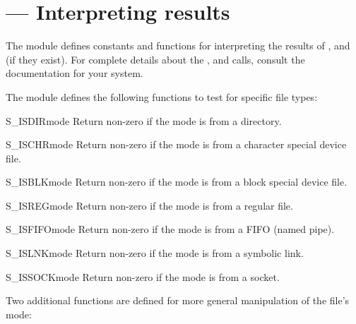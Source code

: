 \section{ ---
         Interpreting  results}



The  module defines constants and functions for
interpreting the results of ,
 and  (if they exist).  For
complete details about the ,  and
 calls, consult the documentation for your system.

The  module defines the following functions to test for
specific file types:


\begin{funcdesc}{S_ISDIR}{mode}
Return non-zero if the mode is from a directory.
\end{funcdesc}

\begin{funcdesc}{S_ISCHR}{mode}
Return non-zero if the mode is from a character special device file.
\end{funcdesc}

\begin{funcdesc}{S_ISBLK}{mode}
Return non-zero if the mode is from a block special device file.
\end{funcdesc}

\begin{funcdesc}{S_ISREG}{mode}
Return non-zero if the mode is from a regular file.
\end{funcdesc}

\begin{funcdesc}{S_ISFIFO}{mode}
Return non-zero if the mode is from a FIFO (named pipe).
\end{funcdesc}

\begin{funcdesc}{S_ISLNK}{mode}
Return non-zero if the mode is from a symbolic link.
\end{funcdesc}

\begin{funcdesc}{S_ISSOCK}{mode}
Return non-zero if the mode is from a socket.
\end{funcdesc}

Two additional functions are defined for more general manipulation of
the file's mode:

